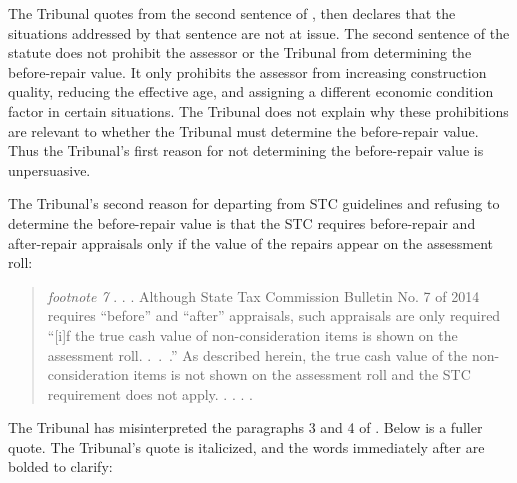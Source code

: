 \documentclass[12pt,\documentclassflag]{michiganCourtOfAppealsBrief}
\begin{document}
The Tribunal quotes from the second sentence of \mathieuGast, then declares that the situations addressed by that sentence are not at issue. The second sentence of the statute does not prohibit the assessor or the Tribunal from determining the before-repair value. It only prohibits the assessor from increasing construction quality, reducing the effective age, and assigning a different economic condition factor in certain situations. 
The Tribunal does not explain why these prohibitions are relevant to whether the Tribunal must determine the before-repair value.
Thus the Tribunal's first reason for not determining the before-repair value is unpersuasive. %

The Tribunal's second reason for departing from STC guidelines and refusing to determine the before-repair value is that the STC requires before-repair and after-repair appraisals only if the value of the repairs appear on the assessment roll:

\begin{quote}
  {\em footnote 7} . . .  Although State Tax Commission Bulletin No. 7 of 2014 requires ``before'' and ``after'' appraisals, such appraisals are only required ``[i]f the true cash value of non-consideration items is shown on the assessment roll. .~.~.'' As described herein, the true cash value of the non-consideration items is not shown on the assessment roll and the STC requirement does not apply. . . . \reconsiderationDenied[2].
\end{quote}

The Tribunal has misinterpreted the paragraphs 3 and 4 of . Below is a fuller quote. The Tribunal's quote is italicized, and the words immediately after are bolded to clarify:
\end{document}
